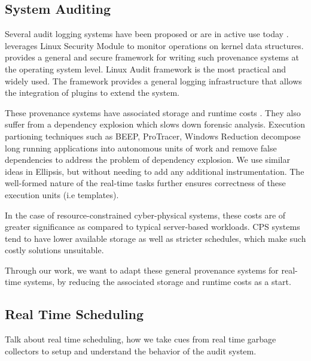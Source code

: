 \subsection{System Auditing}
Several audit logging systems have been proposed or are in active use today \cite{audit,ma2016protracer,gehani2012spade,hifi2012}. \cite{hifi2012} leverages Linux Security Module to monitor operations on kernel data structures. \cite{bates2015trustworthy} provides a general and secure framework for writing such provenance systems at the operating system level. Linux Audit framework \cite{audit} is the most practical and widely used. The framework provides a general logging infrastructure that allows the integration of plugins to extend the system.

These provenance systems have associated storage and runtime costs \cite{bates2017,maUsenix18}. They also suffer from a dependency explosion which slows down forensic analysis. Execution partioning techniques such as BEEP, ProTracer, Windows Reduction decompose long running applications into autonomous units of work and remove false dependencies to address the problem of dependency explosion.  We use similar ideas in Ellipsis, but without needing to add any additional instrumentation. The well-formed nature of the real-time tasks further ensures correctness of these execution units (i.e templates).  

In the case of resource-constrained cyber-physical systems, these costs are of greater significance as compared to typical server-based workloads. CPS systems tend to have lower available storage as well as stricter schedules, which make such costly solutions unsuitable. 

Through our work, we want to adapt these general provenance systems for real-time systems, by reducing the associated storage and runtime costs as a start.

\subsection{Real Time Scheduling}
Talk about real time scheduling, how we take cues from real time garbage collectors to setup and understand the behavior of the audit system.

